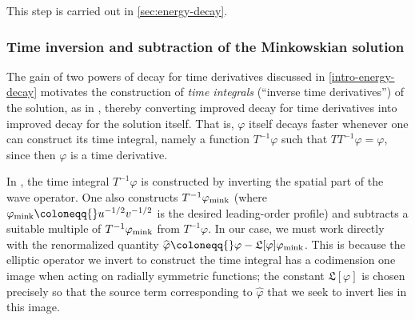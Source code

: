 \documentclass[10pt, reqno]{amsart}
\begin{document}
This step is carried out in \cref{sec:energy-decay}.
\subsubsection{Time inversion and subtraction of the Minkowskian solution}
\label{intro-time-inversion} The gain of two powers of decay for time derivatives
discussed in \cref{intro-energy-decay} motivates the construction of \emph{time integrals}
(``inverse time derivatives'') of the solution, as in
\cite{MR3725885,ANGELOPOULOS2023108939,GAJIC2023110058}, thereby converting
improved decay for time derivatives into improved decay for the solution itself.
That is, \(\varphi{}\) itself decays faster whenever one can construct its time
integral, namely a function \(T^{-1}\varphi{}\) such that \(TT^{-1}\varphi{} =
\varphi{}\), since then \(\varphi{}\) is a time derivative.

In \cite{GAJIC2023110058}, the time integral \(T^{-1}\varphi{}\) is constructed by
inverting the spatial part of the wave operator. One also constructs
\(T^{-1}\varphi_{\textnormal{mink}}\) (where \(\varphi{}_{\textnormal{mink}}
\coloneqq{} u^{-1/2}v^{-1/2}\) is the desired leading-order profile) and
subtracts a suitable multiple of \(T^{-1}\varphi_{\textnormal{mink}}\) from
\(T^{-1}\varphi{}\). In our case, we must work directly with the renormalized
quantity \(\widehat{\varphi{}} \coloneqq{} \varphi{} -
\mathfrak{L}[\varphi{}]\varphi_{\textnormal{mink}}\). This is because the
elliptic operator we invert to construct the time integral has a codimension one
image when acting on radially symmetric functions; the constant
\(\mathfrak{L}[\varphi{}]\) is chosen precisely so that the source term
corresponding to \(\widehat{\varphi{}}\) that we seek to invert lies in this
image.
\end{document}
